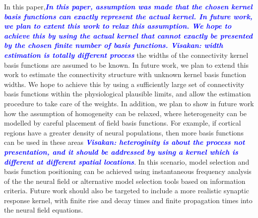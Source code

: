 \documentclass[10pt,a4paper]{article}
\newcommand{\parham}[1]{\textsf{\emph{\textbf{\textcolor{blue}{#1}}}}}
\begin{document}
In this paper,\parham{In this paper, assumption was made that the chosen kernel basis functions can exactly represent the actual kernel. In future work, we plan to extent this work to relax this assumption. We hope to achieve this by using the actual kernel that cannot exactly be presented by the chosen finite number of basis functions. Visakan: width estimation is totally different process} the widths of the connectivity kernel basis functions are assumed to be known. In future work, we plan to extend this work to estimate the connectivity structure with unknown kernel basis function widths. We hope to achieve this by using a sufficiently large set of connectivity basis functions within the physiological plausible limits, and allow the estimation procedure to take care of the weights. In addition, we plan to show in future work how the assumption of homogeneity can be relaxed, where heterogeneity can be modelled by careful placement of field basis functions. For example, if cortical regions have a greater density of neural populations, then more basis functions can be used in these areas \parham{Visakan: heteroginity is about the process not presentation, and it should be addressed by using a kernel which is different at different spatial locations}. In this scenario, model selection and basis function positioning can be achieved using instantaneous frequency analysis of the the neural field or alternative model selection tools based on information criteria. Future work should also be targeted to include a more realistic synaptic response kernel, with finite rise and decay times and finite propagation times into the neural field equations.

\appendix 
\end{document}
